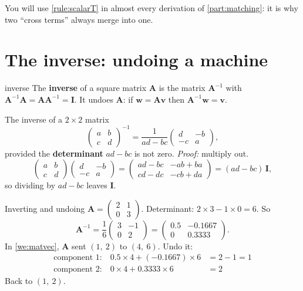 \documentclass[11pt,a4paper,oneside,openany]{book}
\newcommand{\B}[1]{{\symbf{#1}}}
\newcommand{\B}[1]{{\bm{#1}}}
\newcommand{\vv}{\B{v}}
\newcommand{\vw}{\B{w}}
\newcommand{\mI}{\B{I}}
\newcommand{\mA}{\B{A}}
\begin{document}
You will use \cref{rule:scalarT} in almost every derivation of \cref{part:matching}: it is why two ``cross terms''
always merge into one.

\section{The inverse: undoing a machine}

\begin{defn}{inverse}
The \textbf{inverse} of a square matrix $\mA$ is the matrix $\mA^{-1}$ with $\mA^{-1}\mA=\mA\mA^{-1}=\mI$. It undoes
$\mA$: if $\vw=\mA\vv$ then $\mA^{-1}\vw=\vv$.
\end{defn}

\begin{rulebox}[label=rule:inv2]{The inverse of a $2\times2$ matrix}
\[
  \begin{pmatrix}a&b\\c&d\end{pmatrix}^{-1}=\frac{1}{ad-bc}\begin{pmatrix}d&-b\\-c&a\end{pmatrix},
\]
provided the \textbf{determinant} $ad-bc$ is not zero. \emph{Proof:} multiply out.
\[
  \begin{pmatrix}a&b\\c&d\end{pmatrix}\begin{pmatrix}d&-b\\-c&a\end{pmatrix}
  =\begin{pmatrix}ad-bc&-ab+ba\\cd-dc&-cb+da\end{pmatrix}=(ad-bc)\,\mI ,
\]
so dividing by $ad-bc$ leaves $\mI$.
\end{rulebox}

\begin{worked}[label=we:inv]{Inverting and undoing}
$\mA=\begin{pmatrix}2&1\\0&3\end{pmatrix}$. Determinant: $2\times3-1\times0=6$. So
\[
  \mA^{-1}=\frac16\begin{pmatrix}3&-1\\0&2\end{pmatrix}=\begin{pmatrix}0.5&-0.1667\\0&0.3333\end{pmatrix}.
\]
In \cref{we:matvec}, $\mA$ sent $(1,\ 2)$ to $(4,\ 6)$. Undo it:
\begin{align*}
\text{component 1:}\quad 0.5\times4+(-0.1667)\times6 &= 2-1=1\\
\text{component 2:}\quad 0\times4+0.3333\times6 &= 2
\end{align*}
Back to $(1,\ 2)$.
\end{worked}
\end{document}
